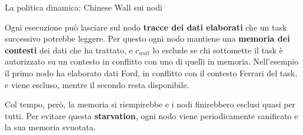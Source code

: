 \documentclass[aspectratio=169,12pt]{beamer}
\begin{document}
\begin{frame}{La politica dinamica: Chinese Wall sui nodi}
{Ogni esecuzione può lasciare sul nodo \textbf{tracce dei dati elaborati} che un task successivo potrebbe leggere. Per questo ogni nodo mantiene una \textbf{memoria dei contesti} dei dati che ha trattato, e $c_{wall}$ lo esclude se chi sottomette il task è autorizzato su un contesto in conflitto con uno di quelli in memoria. Nell'esempio il primo nodo ha elaborato dati Ford, in conflitto con il contesto Ferrari del task, e viene escluso, mentre il secondo resta disponibile.

Col tempo, però, la memoria si riempirebbe e i nodi finirebbero esclusi quasi per tutti. Per evitare questa \textbf{starvation}, ogni nodo viene periodicamente sanificato e la sua memoria svuotata.}
\end{frame}

\end{document}

